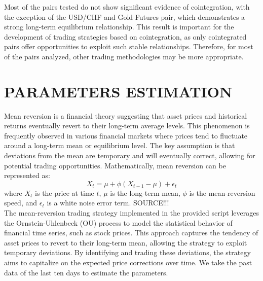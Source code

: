 \documentclass{article}
\begin{document}
Most of the pairs tested do not show significant evidence of cointegration, with the exception of the USD/CHF and Gold Futures pair, which demonstrates a strong long-term equilibrium relationship. This result is important for the development of trading strategies based on cointegration, as only cointegrated pairs offer opportunities to exploit such stable relationships. Therefore, for most of the pairs analyzed, other trading methodologies may be more appropriate.

\clearpage



















\section{PARAMETERS ESTIMATION}
Mean reversion is a financial theory suggesting that asset prices and historical returns eventually revert to their long-term average levels. This phenomenon is frequently observed in various financial markets where prices tend to fluctuate around a long-term mean or equilibrium level. The key assumption is that deviations from the mean are temporary and will eventually correct, allowing for potential trading opportunities. Mathematically, mean reversion can be represented as:
\begin{equation}
X_t = \mu + \phi (X_{t-1} - \mu) + \epsilon_t
\end{equation}
where \( X_t \) is the price at time \( t \), \( \mu \) is the long-term mean, \( \phi \) is the mean-reversion speed, and \( \epsilon_t \) is a white noise error term.
SOURCE!!!\\


The mean-reversion trading strategy implemented in the provided script leverages the Ornstein-Uhlenbeck (OU) process to model the statistical behavior of financial time series, such as stock prices. This approach captures the tendency of asset prices to revert to their long-term mean, allowing the strategy to exploit temporary deviations. By identifying and trading these deviations, the strategy aims to capitalize on the expected price corrections over time.
We take the past data of the last ten days to estimate the parameters.
\end{document}
